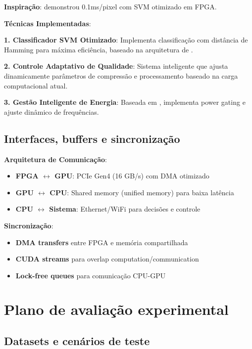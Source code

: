\textbf{Inspiração}: \textcite{Martins2019} demonstrou 0.1ms/pixel com SVM otimizado em FPGA.

\textbf{Técnicas Implementadas}:

\textbf{1. Classificador SVM Otimizado}: Implementa classificação com distância de Hamming para máxima eficiência, baseado na arquitetura de \textcite{Martins2019}.

\textbf{2. Controle Adaptativo de Qualidade}: Sistema inteligente que ajusta dinamicamente parâmetros de compressão e processamento baseado na carga computacional atual.

\textbf{3. Gestão Inteligente de Energia}: Baseada em \textcite{Hwang2011}, implementa power gating e ajuste dinâmico de frequências.

\subsection{Interfaces, buffers e sincronização}\label{subsec:interfaces_buffers}

\textbf{Arquitetura de Comunicação}:
\begin{itemize}
    \item \textbf{FPGA $\leftrightarrow$ GPU}: PCIe Gen4 (16 GB/s) com DMA otimizado
    \item \textbf{GPU $\leftrightarrow$ CPU}: Shared memory (unified memory) para baixa latência
    \item \textbf{CPU $\leftrightarrow$ Sistema}: Ethernet/WiFi para decisões e controle
\end{itemize}

\textbf{Sincronização}:
\begin{itemize}
    \item \textbf{DMA transfers} entre FPGA e memória compartilhada
    \item \textbf{CUDA streams} para overlap computation/communication
    \item \textbf{Lock-free queues} para comunicação CPU-GPU
\end{itemize}

\section{Plano de avaliação experimental}\label{sec:plano_avaliacao}

\subsection{Datasets e cenários de teste}\label{subsec:datasets_cenarios}


